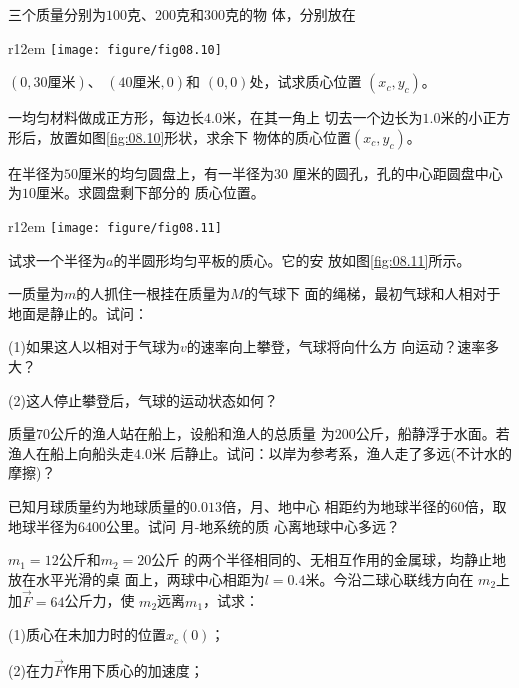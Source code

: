 \documentclass[../outline-of-mechanics.tex]{subfiles}
\begin{document}
\clearpage
\begin{exercises}

\exercise 三个质量分别为$ 100 $克、$ 200 $克和$ 300 $克的物
体，分别放在
\begin{wrapfigure}[9]{r}{12em}
  \centering
  \texttt{[image: figure/fig08.10]}
  \caption{}
  \label{fig:08.10}
\end{wrapfigure}
$ \left(0, 30 \text {厘米} \right) $、
$ \left(40 \text{厘米}, 0 \right) $和
$ \left(0, 0 \right) $处，试求质心位置
$ \left( x _ { c } , y _ { c } \right) $。

\exercise 一均匀材料做成正方形，每边长$ 4.0 $米，在其一角上
切去一个边长为$ 1.0 $米的小正方形后，放置如图\ref{fig:08.10}形状，求余下
物体的质心位置$ \left( x _ { c } , y _ { c } \right) $。

\exercise 在半径为$ 50 $厘米的均匀圆盘上，有一半径为$ 30 $
厘米的圆孔，孔的中心距圆盘中心为$ 10 $厘米。求圆盘剩下部分的
质心位置。

\begin{wrapfigure}[8]{r}{12em}
  \centering
  \texttt{[image: figure/fig08.11]}
  \caption{}
  \label{fig:08.11}
\end{wrapfigure}
\exercise 试求一个半径为$ a $的半圆形均匀平板的质心。它的安
放如图\ref{fig:08.11}所示。

\exercise 一质量为$ m $的人抓住一根挂在质量为$ M $的气球下
面的绳梯，最初气球和人相对于地面是静止的。试问：

(1)如果这人以相对于气球为$ v $的速率向上攀登，气球将向什么方
向运动？速率多大？

(2)这人停止攀登后，气球的运动状态如何？

\exercise 质量$ 70 $公斤的渔人站在船上，设船和渔人的总质量
为$ 200 $公斤，船静浮于水面。若渔人在船上向船头走$ 4.0 $米
后静止。试问：以岸为参考系，渔人走了多远(不计水的摩擦)？

\exercise 已知月球质量约为地球质量的$ 0.013 $倍，月、地中心
相距约为地球半径的$ 60 $倍，取地球半径为$ 6400 $公里。试问
月-地系统的质
心离地球中心多远？

\exercise \;$ m _ { 1 } = 12 $公斤和$ m _ { 2 } = 20 $公斤
的两个半径相同的、无相互作用的金属球，均静止地放在水平光滑的桌
面上，两球中心相距为$ l = 0.4 $米。今沿二球心联线方向在
$ m _ { 2 } $上加$ \vec { F } = 64 $公斤力，使
$ m _ { 2 } $远离$ m _ { 1 } $，试求：

(1)质心在未加力时的位置$ x _ { c } \left( 0 \right) $；

(2)在力$ \vec { F } $作用下质心的加速度；


\end{exercises}
\end{document}
